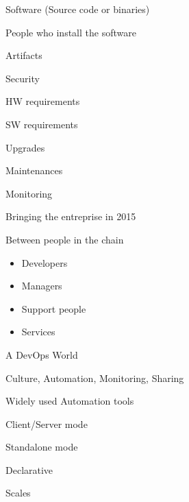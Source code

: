\begin{iframe}
\item Software (Source code or binaries)
\item People who install the software
\end{iframe}

\begin{iframe}
\item Artifacts
\item Security
\item HW requirements
\item SW requirements
\item Upgrades
\item Maintenances
\item Monitoring
\end{iframe}
\begin{iframe}
\item Bringing the entreprise in 2015
\item Between people in the chain
    \begin{itemize}
        \item Developers
        \item Managers
        \item Support people
        \item Services
    \end{itemize}
\item A DevOps World
\item Culture, Automation, Monitoring, Sharing
\end{iframe}






\begin{iframe}[Puppet]
\item Widely used Automation tools
\item Client/Server mode
\item Standalone mode
\item Declarative
\item Scales
\end{iframe}

